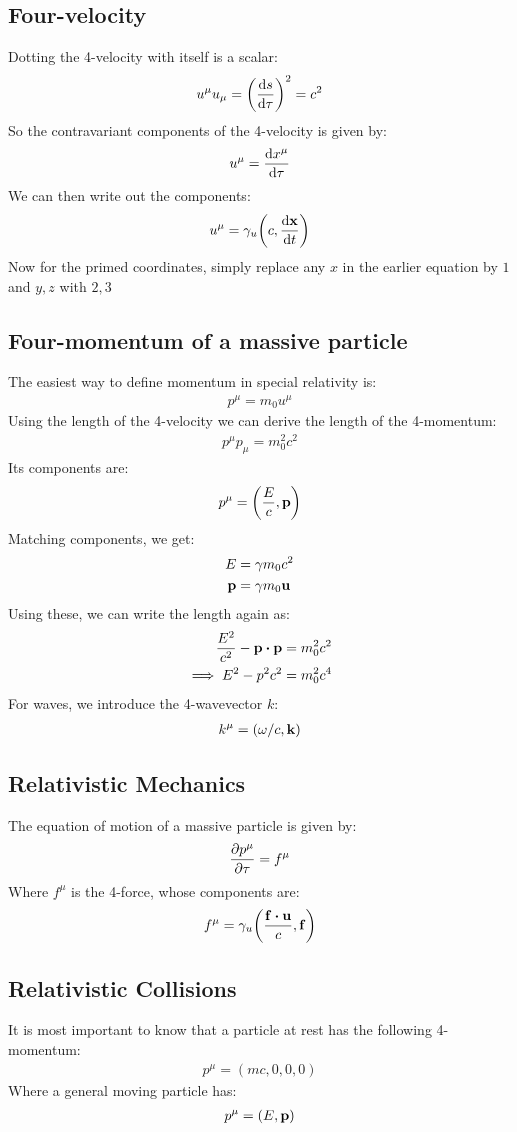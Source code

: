 \documentclass[12pt]{article}
\begin{document}
\subsection{Four-velocity}
Dotting the 4-velocity with itself is a scalar:
\begin{align*}
  u^\mu u_\mu=\qty(\dv{s}{\tau})^2=c^2
\end{align*}
So the contravariant components of the 4-velocity is given by:
\begin{align*}
  u^\mu=\dv{x^\mu}{\tau}
\end{align*}
We can then write out the components:
\begin{align*}
  u^\mu=\gamma_u\qty(c,\dv{\vb{x}}{t})
\end{align*}
Now for the primed coordinates, simply replace any $x$ in the earlier equation by $1$ and $y,z$ with  $2,3$
\subsection{Four-momentum of a massive particle}
The easiest way to define momentum in special relativity is:
\begin{align*}
  p^\mu=m_0u^\mu
\end{align*}
Using the length of the 4-velocity we can derive the length of the 4-momentum:
\begin{align*}
  p^\mu p_\mu=m_0^2c^2
\end{align*}
Its components are:
\begin{align*}
  p^\mu=\qty(\frac{E}{c},\vb{p})
\end{align*}
Matching components, we get:
\begin{align*}
  E&=\gamma m_0c^2\\
  \vb{p}&=\gamma m_0\vb{u}
\end{align*}
Using these, we can write the length again as:
\begin{align*}
  \frac{E^2}{c^2}-\vb{p}\vdot\vb{p}&=m_0^2c^2\\
  \implies E^2-p^2c^2&=m_0^2c^4
\end{align*}
For waves, we introduce the 4-wavevector $k$:
\begin{align*}
  k^\mu=(\omega/c,\vb{k})
\end{align*}
\subsection{Relativistic Mechanics}
The equation of motion of a massive particle is given by:
\begin{align*}
  \pdv{p^\mu}{\tau}=f^\mu
\end{align*}
Where $f^\mu$ is the 4-force, whose components are:
\begin{align*}
  f^\mu=\gamma_u\qty(\frac{\vb{f}\vdot\vb{u}}{c},\vb{f})
\end{align*}
\subsection{Relativistic Collisions}
It is most important to know that a particle at rest has the following 4-momentum:
\begin{align*}
  p^\mu=(mc,0,0,0)
\end{align*}
Where a general moving particle has:
\begin{align*}
  p^\mu=(E,\vb{p})
\end{align*}
\end{document}

